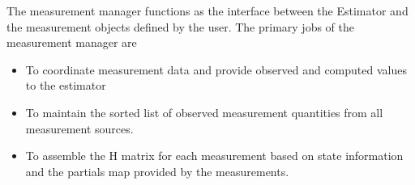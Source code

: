 The measurement manager functions as the interface between the Estimator and the measurement objects
defined by the user.  The primary jobs of the measurement manager are

\begin{itemize}
\item To coordinate measurement data and provide observed and computed values to the estimator
\item To maintain the sorted list of observed measurement quantities from all measurement sources.
\item To assemble the H matrix for each measurement based on state information and the partials map
provided by the measurements.
\end{itemize}
